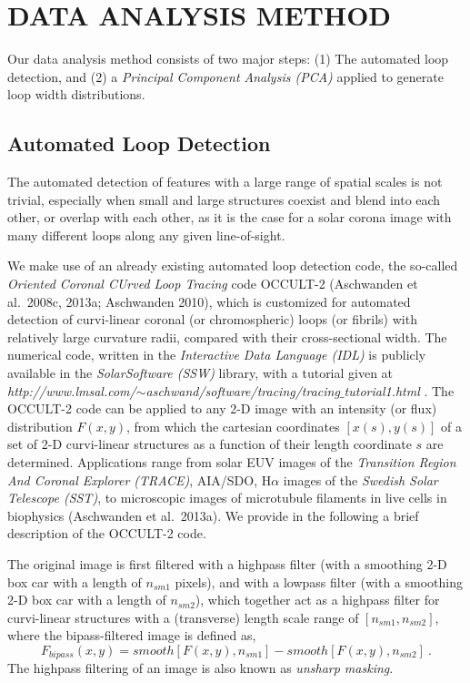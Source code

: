 \documentclass[10pt,preprint]{aastex}  %
\begin{document}
\section{	DATA ANALYSIS METHOD		}

Our data analysis method consists of two major steps: (1) The automated
loop detection, and (2) a {\sl Principal Component Analysis (PCA)}
applied to generate loop width distributions. 

\subsection{	Automated Loop Detection			}

The automated detection of features with a large range of spatial
scales is not trivial, especially when small and large structures
coexist and blend into each other, or overlap with each other, as it
is the case for a solar corona image with many different loops along
any given line-of-sight.

We make use of an already existing automated loop detection code,
the so-called {\sl Oriented Coronal CUrved Loop Tracing} code OCCULT-2
(Aschwanden et al.~2008c, 2013a; Aschwanden 2010), which is customized 
for automated detection of curvi-linear coronal (or chromospheric) 
loops (or fibrils) with relatively large curvature radii, compared 
with their cross-sectional width. The numerical code, written in the
{\sl Interactive Data Language (IDL)} is publicly available
in the {\sl SolarSoftware (SSW)} library, with a tutorial given at 
{\it http://www.lmsal.com/$\sim$aschwand/software/tracing/tracing$\_$tutorial1.html} .
The OCCULT-2 code can be applied
to any 2-D image with an intensity (or flux) distribution $F(x,y)$,
from which the cartesian coordinates $[x(s), y(s)]$ of a set of
2-D curvi-linear structures as a function of their length 
coordinate $s$ are determined. Applications range from solar EUV  
images of the {\sl Transition Region And Coronal Explorer (TRACE)},
AIA/SDO, H$\alpha$ images of the {\sl Swedish Solar Telescope (SST)},
to microscopic images of microtubule filaments in live cells in
biophysics (Aschwanden et al.~2013a). We provide in the following
a brief description of the OCCULT-2 code. 

The original image is first
filtered with a highpass filter (with a smoothing 2-D box car with a
length of $n_{sm1}$ pixels), and with a lowpass filter (with a smoothing
2-D box car with a length of $n_{sm2}$), which together act as a
highpass filter for curvi-linear structures with a (transverse) length 
scale range of $[n_{sm1}, n_{sm2}]$, where the bipass-filtered image
is defined as,
\begin{equation}
	F_{bipass}(x,y) = smooth{[F(x,y), n_{sm1}]} - smooth{[F(x,y), n_{sm2}]} \ . 
\end{equation}
The highpass filtering of an image is also known as {\sl unsharp masking}.
\end{document}
